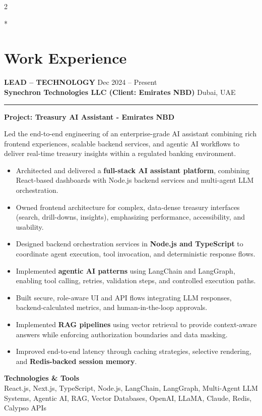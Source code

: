 \documentclass[10pt,a4paper]{article}
\newcommand{\roleheader}[4]{%
  \noindent
  \textbf{\MakeUppercase{#3}}%
  \hfill
  \textcolor{secondary}{#4}\\[0pt]

  \noindent
  \textbf{#1}%
  \hfill
  \textcolor{secondary}{#2}\\[0pt]
}
\newcommand{\roledivider}{%
  \vspace{-1pt}%
  {\color{rulecolor}\rule{\linewidth}{0.5pt}}%
  \vspace{2pt}%
}
\newcommand{\projecttitle}[1]{\textbf{#1}\par\vspace{2pt}}
\begin{document}
\begin{paracol}{2}

\switchcolumn[0]*
\section*{Work Experience}
\roleheader{Synechron Technologies LLC (Client: Emirates NBD)}{Dubai, UAE}{Lead -- Technology}{Dec 2024 -- Present}
\roledivider

\projecttitle{Project: Treasury AI Assistant - Emirates NBD}
Led the end-to-end engineering of an enterprise-grade AI assistant combining rich frontend experiences, scalable backend services, and agentic AI workflows to deliver real-time treasury insights within a regulated banking environment.

\begin{itemize}
  \item Architected and delivered a \textbf{full-stack AI assistant platform}, combining React-based dashboards with Node.js backend services and multi-agent LLM orchestration.
  \item Owned frontend architecture for complex, data-dense treasury interfaces (search, drill-downs, insights), emphasizing performance, accessibility, and usability.
  \item Designed backend orchestration services in \textbf{Node.js and TypeScript} to coordinate agent execution, tool invocation, and deterministic response flows.
  \item Implemented \textbf{agentic AI patterns} using LangChain and LangGraph, enabling tool calling, retries, validation steps, and controlled execution paths.
  \item Built secure, role-aware UI and API flows integrating LLM responses, backend-calculated metrics, and human-in-the-loop approvals.
  \item Implemented \textbf{RAG pipelines} using vector retrieval to provide context-aware answers while enforcing authorization boundaries and data masking.
  \item Improved end-to-end latency through caching strategies, selective rendering, and \textbf{Redis-backed session memory}.
\end{itemize}

\textbf{Technologies \& Tools}\\
React.js, Next.js, TypeScript, Node.js, LangChain, LangGraph, Multi-Agent LLM Systems, Agentic AI, RAG, Vector Databases, OpenAI, LLaMA, Claude, Redis, Calypso APIs


\end{paracol}
\end{document}
